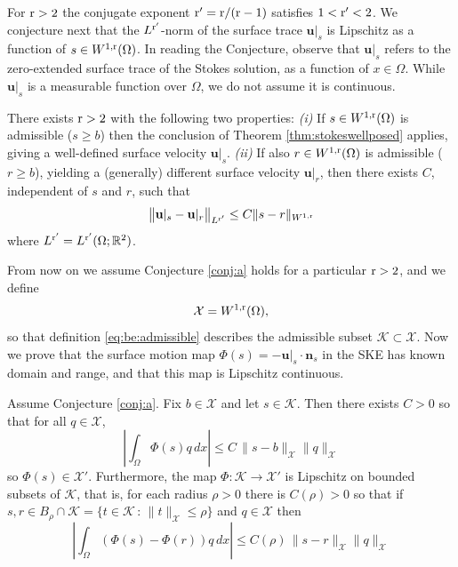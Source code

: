 \documentclass[hidelinks,onefignum,onetabnum,final]{siamart220329}  %
\newcommand{\RR}{\mathbb{R}}
\newcommand{\bn}{\mathbf{n}}
\newcommand{\bu}{\mathbf{u}}
\newcommand{\cK}{\mathcal{K}}
\newcommand{\cX}{\mathcal{X}}
\newcommand{\rr}{{\text{\textnormal{r}}}}
\begin{document}
For $\rr>2$ the conjugate exponent $\rr'=\rr/(\rr-1)$ satisfies $1<\rr'<2$.  We conjecture next that the $L^{\rr'}$-norm of the surface trace $\bu|_s$ is Lipschitz as a function of $s \in W^{1,\rr}(\Omega)$.  In reading the Conjecture, observe that $\bu|_s$ refers to the zero-extended surface trace of the Stokes solution, as a function of $x\in\Omega$.  While $\bu|_s$ is a measurable function over $\Omega$, we do not assume it is continuous.

\begin{conjecture} \label{conj:a}  There exists $\rr>2$ with the following two properties:  \emph{(i)} If $s\in W^{1,\rr}(\Omega)$ is admissible ($s\ge b$) then the conclusion of Theorem \ref{thm:stokeswellposed} applies, giving a well-defined surface velocity $\bu|_s$.  \emph{(ii)} If also $r\in W^{1,\rr}(\Omega)$ is admissible ($r\ge b$), yielding a (generally) different surface velocity $\bu|_r$, then there exists $C$, independent of $s$ and $r$, such that
\begin{equation}
\big\|\bu|_s - \bu|_r\big\|_{L^{\rr'}} \le C \|s-r\|_{W^{1,\rr}} \label{eq:ulipschitz}
\end{equation}
where $L^{\rr'}=L^{\rr'}(\Omega;\RR^2)$.
\end{conjecture}

From now on we assume Conjecture \ref{conj:a} holds for a particular $\rr>2$, and we define
\begin{equation}
\cX = W^{1,\rr}(\Omega), \label{eq:defineX}
\end{equation}
so that definition \eqref{eq:be:admissible} describes the admissible subset $\cK \subset \cX$.  Now we prove that the surface motion map $\Phi(s)=-\bu|_s\cdot \bn_s$ in the SKE has known domain and range, and that this map is Lipschitz continuous.

\begin{lemma} \label{lem:philipschitz}
Assume Conjecture \ref{conj:a}.  Fix $b \in \cX$ and let $s\in\cK$.  Then there exists $C>0$ so that for all $q\in\cX$,
\begin{equation}
\left|\int_\Omega \Phi(s) q\,dx\right| \le C\, \|s-b\|_{\cX} \|q\|_{\cX} \label{eq:phibound}
\end{equation}
so $\Phi(s)\in\cX'$.  Furthermore, the map $\Phi:\cK\to\cX'$ is Lipschitz on bounded subsets of $\cK$, that is, for each radius $\rho>0$ there is $C(\rho)>0$ so that if $s,r\in B_\rho \cap \cK = \{t\in \cK\,:\,\|t\|_{\cX} \le \rho\}$ and $q\in\cX$ then
\begin{equation}
\left|\int_\Omega \left(\Phi(s) - \Phi(r)\right) q\,dx\right| \le C(\rho)\, \|s-r\|_{\cX} \|q\|_{\cX}  \label{eq:philipschitz}
\end{equation}
\end{lemma}
\end{document}
